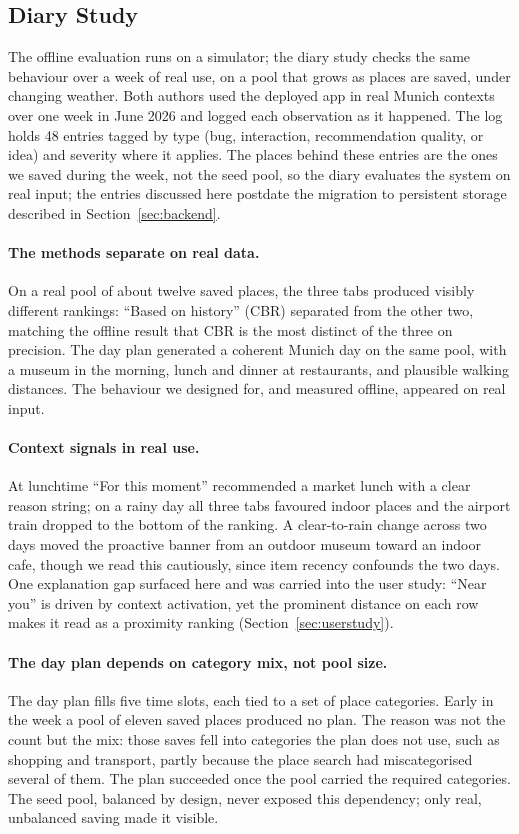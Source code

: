 \documentclass[acmlarge]{acmart}
\begin{document}
\subsection{Diary Study}
\label{sec:diary}

The offline evaluation runs on a simulator; the diary study checks the same
behaviour over a week of real use, on a pool that grows as places are
saved, under changing weather. Both authors used the deployed app in real
Munich contexts over one week in June 2026 and logged each observation as
it happened. The log holds 48 entries tagged by type (bug, interaction,
recommendation quality, or idea) and severity where it applies. The places
behind these entries are the ones we saved during the week, not the seed
pool, so the diary evaluates the system on real input; the entries
discussed here postdate the migration to persistent storage described in
Section~\ref{sec:backend}.

\paragraph{The methods separate on real data.}
On a real pool of about twelve saved places, the three tabs produced
visibly different rankings: ``Based on history'' (CBR) separated from the
other two, matching the offline result that CBR is the most distinct of
the three on precision. The day plan generated a coherent Munich day on
the same pool, with a museum in the morning, lunch and dinner at
restaurants, and plausible walking distances. The behaviour we designed
for, and measured offline, appeared on real input.

\paragraph{Context signals in real use.}
At lunchtime ``For this moment'' recommended a market lunch with a clear
reason string; on a rainy day all three tabs favoured indoor places and
the airport train dropped to the bottom of the ranking. A clear-to-rain
change across two days moved the proactive banner from an outdoor museum
toward an indoor cafe, though we read this cautiously, since item recency
confounds the two days. One explanation gap surfaced here and was carried
into the user study: ``Near you'' is driven by context activation, yet the
prominent distance on each row makes it read as a proximity ranking
(Section~\ref{sec:userstudy}).

\paragraph{The day plan depends on category mix, not pool size.}
The day plan fills five time slots, each tied to a set of place
categories. Early in the week a pool of eleven saved places produced no
plan. The reason was not the count but the mix: those saves fell into
categories the plan does not use, such as shopping and transport, partly
because the place search had miscategorised several of them. The plan
succeeded once the pool carried the required categories. The seed pool,
balanced by design, never exposed this dependency; only real, unbalanced
saving made it visible.
\end{document}
